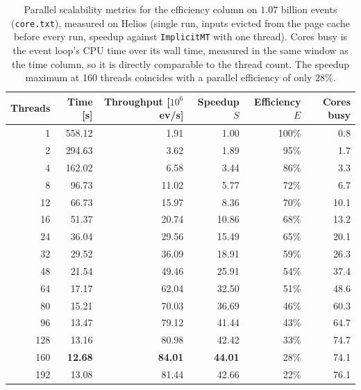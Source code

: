 \begin{table}[htbp]
\centering
\caption{Parallel scalability metrics for the efficiency column on $1.07$ billion events (\texttt{core.txt}), measured on Helios (single run, inputs evicted from the page cache before every run, speedup against \texttt{ImplicitMT} with one thread). Cores busy is the event loop's CPU time over its wall time, measured in the same window as the time column, so it is directly comparable to the thread count. The speedup maximum at 160 threads coincides with a parallel efficiency of only $28\%$.}
\label{tab:scalability-efficiency}
\begin{tabular}{rrrrrr}
\toprule
Threads & Time [s] & Throughput [$10^6$ ev/s] & Speedup $S$ & Efficiency $E$ & Cores busy \\
\midrule
 1 & 558.12 & 1.91 & 1.00 & 100\% & 0.8 \\
 2 & 294.63 & 3.62 & 1.89 & 95\% & 1.7 \\
 4 & 162.02 & 6.58 & 3.44 & 86\% & 3.3 \\
 8 & 96.73 & 11.02 & 5.77 & 72\% & 6.7 \\
12 & 66.73 & 15.97 & 8.36 & 70\% & 10.1 \\
16 & 51.37 & 20.74 & 10.86 & 68\% & 13.2 \\
24 & 36.04 & 29.56 & 15.49 & 65\% & 20.1 \\
32 & 29.52 & 36.09 & 18.91 & 59\% & 26.3 \\
48 & 21.54 & 49.46 & 25.91 & 54\% & 37.4 \\
64 & 17.17 & 62.04 & 32.50 & 51\% & 48.6 \\
80 & 15.21 & 70.03 & 36.69 & 46\% & 60.3 \\
96 & 13.47 & 79.12 & 41.44 & 43\% & 64.7 \\
128 & 13.16 & 80.98 & 42.42 & 33\% & 74.7 \\
160 & \textbf{12.68} & \textbf{84.01} & \textbf{44.01} & 28\% & 74.1 \\
192 & 13.08 & 81.44 & 42.66 & 22\% & 76.1 \\
\bottomrule
\end{tabular}
\end{table}

